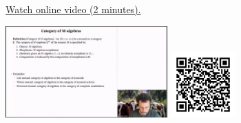 
\begin{minipage}{10cm}
    \href{https://act4e-spring21.netlify.app/videos/spring2021-monads-b:cat-algebras.html}{Watch online video (2 minutes).}
        
    \href{https://act4e-spring21.netlify.app/videos/spring2021-monads-b:cat-algebras.html}{\includegraphics[height=3.5cm]{spring2021-monads-b:cat-algebras/thumbnails.jpg}}
    \href{https://act4e-spring21.netlify.app/videos/spring2021-monads-b:cat-algebras.html}{\includegraphics[height=2.5cm]{spring2021-monads-b:cat-algebras/qrcode.png}}
\end{minipage}
